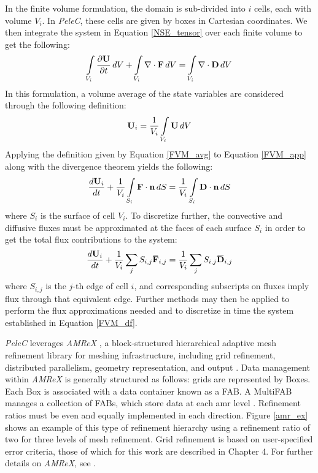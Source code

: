 In the finite volume formulation, the domain is sub-divided into $i$ cells, each with volume $V_i$. In \textit{PeleC}, these cells are given by boxes in Cartesian coordinates. We then integrate the system in Equation \eqref{NSE_tensor} over each finite volume to get the following:
\begin{equation} \label{FVM_app}
\int\limits_{V_i} \dfrac{\partial \vb{U}}{\partial t}\, dV + \int\limits_{V_i} \nabla \cdot \vb{F}\, dV = \int\limits_{V_i} \nabla \cdot \vb{D}\, dV
\end{equation}
In this formulation, a volume average of the state variables are considered through the following definition:
\begin{equation} \label{FVM_avg}
\vb{U}_i = \dfrac{1}{V_i} \int\limits_{V_i} \vb{U} \, dV
\end{equation} 
Applying the definition given by Equation \eqref{FVM_avg} to Equation \eqref{FVM_app} along with the divergence theorem yields the following:
\begin{equation} \label{FVM}
\dfrac{d\vb{U}_i}{dt} + \dfrac{1}{V_i} \int\limits_{S_i} \vb{F}\cdot \vb{n}\, dS = \dfrac{1}{V_i} \int\limits_{S_i} \vb{D} \cdot \vb{n} \, dS 
\end{equation}
where $S_i$ is the surface of cell $V_i$. To discretize further, the convective and diffusive fluxes must be approximated at the faces of each surface $S_i$ in order to get the total flux contributions to the system:
\begin{equation} \label{FVM_df}
\dfrac{d\vb{U}_i}{dt} +  \dfrac{1}{V_i} \sum\limits_j S_{i,j} \overbar{\vb{F}}_{i,j} =  \dfrac{1}{V_i}\sum\limits_j S_{i,j} \overbar{\vb{D}}_{i,j}
\end{equation}
where $S_{i,j}$ is the $j$-th edge of cell $i$, and corresponding subscripts on fluxes imply flux through that equivalent edge. Further methods may then be applied to perform the flux approximations needed and to discretize in time the system established in Equation \eqref{FVM_df}. 

\textit{PeleC} leverages \textit{AMReX} \cite{amrex1, amrex2, amrex3}, a block-structured hierarchical adaptive mesh refinement library for meshing infrastructure, including grid refinement, distributed parallelism, geometry representation, and output \cite{PeleC1}. Data management within \textit{AMReX} is generally structured as follows: grids are represented by Boxes. Each Box is associated with a data container known as a FAB. A MultiFAB manages a collection of FABs, which store data at each \gls{amr} level \cite{PeleC1}. Refinement ratios must be even and equally implemented in each direction. Figure \ref{amr_ex} shows an example of this type of refinement hierarchy using a refinement ratio of two for three levels of mesh refinement. Grid refinement is based on user-specified error criteria, those of which for this work are described in Chapter 4. For further details on \textit{AMReX}, see \cite{amrex1}. 

